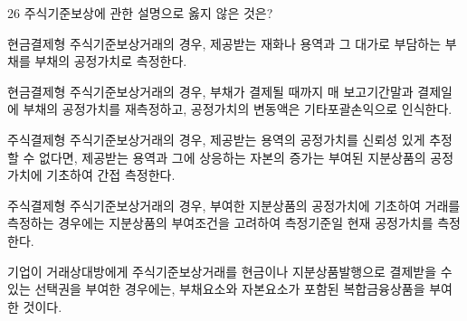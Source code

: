 \begin{question}{26}
주식기준보상에 관한 설명으로 옳지 않은 것은?
\begin{choices}
  \item 현금결제형 주식기준보상거래의 경우, 제공받는 재화나 용역과 그 대가로 부담하는 부채를 부채의 공정가치로 측정한다.
  \item 현금결제형 주식기준보상거래의 경우, 부채가 결제될 때까지 매 보고기간말과 결제일에 부채의 공정가치를 재측정하고, 공정가치의 변동액은 기타포괄손익으로 인식한다.
  \item 주식결제형 주식기준보상거래의 경우, 제공받는 용역의 공정가치를 신뢰성 있게 추정할 수 없다면, 제공받는 용역과 그에 상응하는 자본의 증가는 부여된 지분상품의 공정가치에 기초하여 간접 측정한다.
  \item 주식결제형 주식기준보상거래의 경우, 부여한 지분상품의 공정가치에 기초하여 거래를 측정하는 경우에는 지분상품의 부여조건을 고려하여 측정기준일 현재 공정가치를 측정한다.
  \item 기업이 거래상대방에게 주식기준보상거래를 현금이나 지분상품발행으로 결제받을 수 있는 선택권을 부여한 경우에는, 부채요소와 자본요소가 포함된 복합금융상품을 부여한 것이다.
\end{choices}
\end{question}
